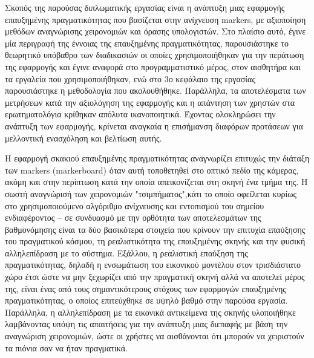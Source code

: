 



Σκοπός της παρούσας διπλωματικής εργασίας είναι η ανάπτυξη μιας εφαρμογής επαυξημένης πραγματικότητας που βασίζεται στην ανίχνευση markers, με αξιοποίηση μεθόδων αναγνώρισης χειρονομιών και όρασης υπολογιστών. Στο πλαίσιο αυτό, έγινε μία περιγραφή της έννοιας της επαυξημένης πραγματικότητας, παρουσιάστηκε το θεωρητικό υπόβαθρο των διαδικασιών οι οποίες χρησιμοποιήθηκαν για την περάτωση της εφαρμογής και έγινε αναφορά στο προγραμματιστικό μέρος, στον αισθητήρα και τα εργαλεία που χρησιμοποιήθηκαν, ενώ στο 3ο κεφάλαιο της εργασίας παρουσιάστηκε η μεθοδολογία που ακολουθήθηκε. Παράλληλα, τα αποτελέσματα των μετρήσεων κατά την αξιολόγηση της εφαρμογής και η απάντηση των χρηστών στα ερωτηματολόγια κρίθηκαν απόλυτα ικανοποιητικά. Έχοντας ολοκληρώσει την ανάπτυξη των εφαρμογής, κρίνεται αναγκαία η επισήμανση διαφόρων προτάσεων για μελλοντική ενασχόληση και βελτίωση αυτής.


Η εφαρμογή σκακιού επαυξημένης πραγματικότητας αναγνωρίζει επιτυχώς την διάταξη των markers (markerboard) όταν αυτή τοποθετηθεί στο οπτικό πεδίο της κάμερας, ακόμη και στην περίπτωση κατά την οποία απεικονίζεται στη σκηνή ένα τμήμα της. Η σωστή αναγνώρισή των χειρονομιών "τσιμπήματος",κάτι το οποίο οφείλεται κυρίως στο χρησιμοποιούμενο αλγόριθμο ανίχνευσης και εντοπισμού του σημείου ενδιαφέροντος – σε συνδυασμό με την ορθότητα των αποτελεσμάτων της βαθμονόμησης είναι τα δύο βασικότερα στοιχεία που κρίνουν την επιτυχία επαύξησης του πραγματικού κόσμου, τη ρεαλιστικότητα της επαυξημένης σκηνής και την φυσική αλληλεπίδραση με το σύστημα. Εξάλλου, η ρεαλιστική επαύξηση της πραγματικότητας, δηλαδή η ενσωμάτωση του εικονικού μοντέλου στον τρισδιάστατο χώρο έτσι ώστε να μην ξεχωρίζει από την πραγματική σκηνή αλλά να αποτελεί μέρος της, είναι ένας από τους σημαντικότερους στόχους των εφαρμογών επαυξημένης πραγματικότητας, ο οποίος επιτεύχθηκε σε υψηλό βαθμό στην παρούσα
εργασία. Παράλληλα, η αλληλεπίδραση με τα εικονικά αντικείμενα της σκηνής υλοποιήθηκε λαμβάνοντας υπόψη τις απαιτήσεις για την ανάπτυξη μιας διεπαφής με βάση την αναγνώριση χειρονομιών, ώστε οι χρήστες να αισθάνονται ότι μπορούν να χειριστούν τα πιόνια σαν να ήταν πραγματικά.


